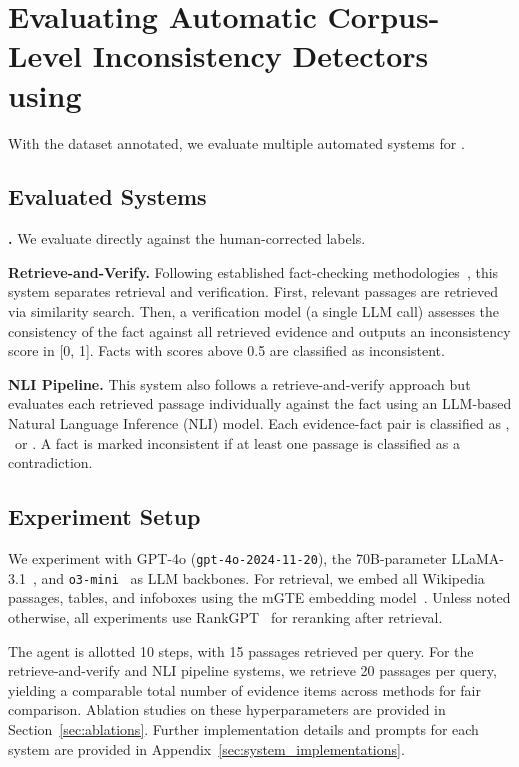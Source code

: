 \section{Evaluating Automatic Corpus-Level Inconsistency Detectors using \dataset}
\label{sec:experiment}
With the dataset annotated, we evaluate multiple automated systems for \task.

\subsection{Evaluated Systems}

\textbf{\system.} We evaluate \system directly against the human-corrected labels.

\textbf{Retrieve-and-Verify.} Following established fact-checking methodologies~\citep{thorne-etal-2018-fever}, this system separates retrieval and verification. First, relevant passages are retrieved via similarity search. Then, a verification model (a single LLM call) assesses the consistency of the fact against all retrieved evidence and outputs an inconsistency score in [0, 1]. Facts with scores above 0.5 are classified as inconsistent.

\textbf{NLI Pipeline.} This system also follows a retrieve-and-verify approach but evaluates each retrieved passage individually against the fact using an LLM-based Natural Language Inference (NLI) model. Each evidence-fact pair is classified as , \supports~or \nei. A fact is marked inconsistent if at least one passage is classified as a contradiction.

\subsection{Experiment Setup}
We experiment with GPT-4o (\texttt{gpt-4o-2024-11-20}), the 70B-parameter LLaMA-3.1~\cite{grattafiori2024llama}, and \texttt{o3-mini}~\cite{openai2025o3} as LLM backbones. For retrieval, we embed all Wikipedia passages, tables, and infoboxes using the mGTE embedding model~\cite{zhang-etal-2024-mgte}. Unless noted otherwise, all experiments use RankGPT~\citep{sun-etal-2023-chatgpt} for reranking after retrieval.

The \system agent is allotted 10 steps, with 15 passages retrieved per query. For the retrieve-and-verify and NLI pipeline systems, we retrieve 20 passages per query, yielding a comparable total number of evidence items across methods for fair comparison. Ablation studies on these hyperparameters are provided in Section~\ref{sec:ablations}. Further implementation details and prompts for each system are provided in Appendix~\ref{sec:system_implementations}.

